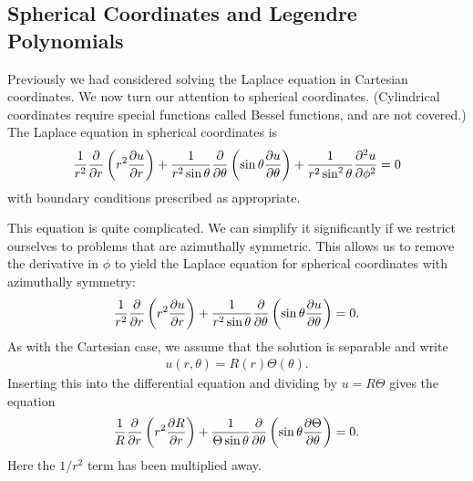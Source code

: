 \subsection{Spherical Coordinates and Legendre Polynomials}

Previously we had considered solving the Laplace equation in Cartesian coordinates. We now turn our attention to spherical coordinates. (Cylindrical coordinates require special functions called Bessel functions, and are not covered.) The Laplace equation in spherical coordinates is
\begin{align}
  \frac{1}{r^2} \frac{ \partial {} }{ \partial {r} } \left( r^2 \frac{ \partial {u} }{ \partial {r} } \right) 
               + \frac{1}{r^2 \sin \theta } \frac{ \partial {} }{ \partial {\theta} } \left( \sin \theta \frac{ \partial {u} }{ \partial {\theta} } \right) 
               + \frac{1}{r^2 \sin^2 \theta } \frac{ \partial^2 {u} }{ \partial {\phi}^2 } = 0
\end{align}
with boundary conditions prescribed as appropriate.

This equation is quite complicated. We can simplify it significantly if we restrict ourselves to problems that are azimuthally symmetric. This allows us to remove the derivative in $\phi$ to yield the Laplace equation for spherical coordinates with azimuthally symmetry:
\begin{align}
  \frac{1}{r^2} \frac{ \partial {} }{ \partial {r} } \left( r^2 \frac{ \partial {u} }{ \partial {r} } \right) 
               + \frac{1}{r^2 \sin \theta } \frac{ \partial {} }{ \partial {\theta} } \left( \sin \theta \frac{ \partial {u} }{ \partial {\theta} } \right) = 0 .
\end{align}
As with the Cartesian case, we assume that the solution is separable and write
\begin{align}
  u(r,\theta) = R(r) \Theta(\theta) .
\end{align}
Inserting this into the differential equation and dividing by $u = R \Theta$ gives the equation
\begin{align}
  \frac{1}{R} \frac{ \partial {} }{ \partial {r} } \left( r^2 \frac{ \partial {R} }{ \partial {r} } \right) 
               + \frac{1}{\Theta \sin \theta } \frac{ \partial {} }{ \partial {\theta} } \left( \sin \theta \frac{ \partial {\Theta} }{ \partial {\theta} } \right) = 0 .
\end{align}
Here the $1/r^2$ term has been multiplied away.

